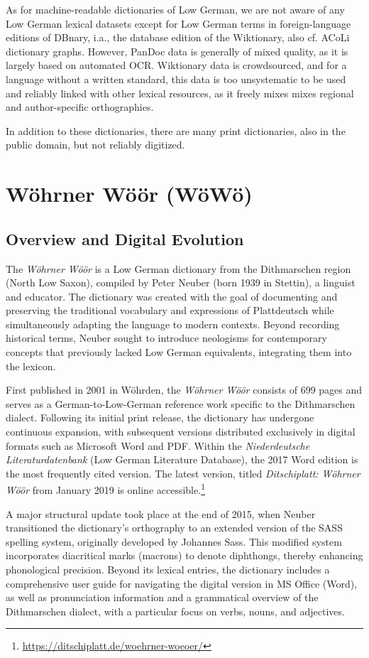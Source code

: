 \documentclass{article}
\begin{document}
As for machine-readable dictionaries of Low German, we are not aware of any Low German lexical datasets except for Low German terms in foreign-language editions of DBnary, i.a., the database edition of the Wiktionary, also cf. ACoLi dictionary graphs. However, PanDoc data is generally of mixed quality, as it is largely based on automated OCR. Wiktionary data is crowdsourced, and for a language without a written standard, this data is too unsystematic to be used and reliably linked with other lexical resources, as it freely mixes mixes regional and author-specific orthographies.

In addition to these dictionaries, there are many print dictionaries, also in the public domain, but not reliably digitized.

\section{Wöhrner Wöör (WöWö)}

\subsection{Overview and Digital Evolution}

The \emph{Wöhrner Wöör} is a Low German dictionary from the Dithmarschen region (North Low Saxon), compiled by Peter Neuber (born 1939 in Stettin), a linguist and educator. The dictionary was created with the goal of documenting and preserving the traditional vocabulary and expressions of Plattdeutsch while simultaneously adapting the language to modern contexts. Beyond recording historical terms, Neuber sought to introduce neologisms for contemporary concepts that previously lacked Low German equivalents, integrating them into the lexicon.

First published in 2001 in Wöhrden, the \emph{Wöhrner Wöör} consists of 699 pages and serves as a German-to-Low-German reference work specific to the Dithmarschen dialect. Following its initial print release, the dictionary has undergone continuous expansion, with subsequent versions distributed exclusively in digital formats such as Microsoft Word and PDF. Within the \emph{Niederdeutsche Literaturdatenbank} (Low German Literature Database), the 2017 Word edition is the most frequently cited version. The latest version, titled \emph{Ditschiplatt: Wöhrner Wöör} from January 2019 is online accessible.\footnote{\url{https://ditschiplatt.de/woehrner-woeoer/}}

A major structural update took place at the end of 2015, when Neuber transitioned the dictionary's orthography to an extended version of the SASS spelling system, originally developed by Johannes Sass. This modified system incorporates diacritical marks (macrons) to denote diphthongs, thereby enhancing phonological precision. Beyond its lexical entries, the dictionary includes a comprehensive user guide for navigating the digital version in MS Office (Word), as well as pronunciation information and a grammatical overview of the Dithmarschen dialect, with a particular focus on verbs, nouns, and adjectives.
\end{document}
